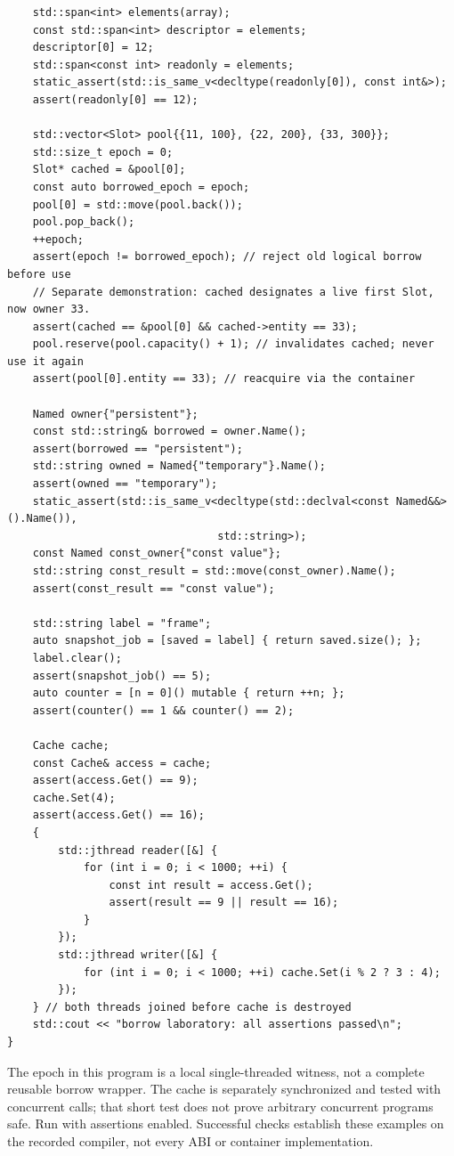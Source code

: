 \begin{verbatim}
    std::span<int> elements(array);
    const std::span<int> descriptor = elements;
    descriptor[0] = 12;
    std::span<const int> readonly = elements;
    static_assert(std::is_same_v<decltype(readonly[0]), const int&>);
    assert(readonly[0] == 12);

    std::vector<Slot> pool{{11, 100}, {22, 200}, {33, 300}};
    std::size_t epoch = 0;
    Slot* cached = &pool[0];
    const auto borrowed_epoch = epoch;
    pool[0] = std::move(pool.back());
    pool.pop_back();
    ++epoch;
    assert(epoch != borrowed_epoch); // reject old logical borrow before use
    // Separate demonstration: cached designates a live first Slot, now owner 33.
    assert(cached == &pool[0] && cached->entity == 33);
    pool.reserve(pool.capacity() + 1); // invalidates cached; never use it again
    assert(pool[0].entity == 33); // reacquire via the container

    Named owner{"persistent"};
    const std::string& borrowed = owner.Name();
    assert(borrowed == "persistent");
    std::string owned = Named{"temporary"}.Name();
    assert(owned == "temporary");
    static_assert(std::is_same_v<decltype(std::declval<const Named&&>().Name()),
                                 std::string>);
    const Named const_owner{"const value"};
    std::string const_result = std::move(const_owner).Name();
    assert(const_result == "const value");

    std::string label = "frame";
    auto snapshot_job = [saved = label] { return saved.size(); };
    label.clear();
    assert(snapshot_job() == 5);
    auto counter = [n = 0]() mutable { return ++n; };
    assert(counter() == 1 && counter() == 2);

    Cache cache;
    const Cache& access = cache;
    assert(access.Get() == 9);
    cache.Set(4);
    assert(access.Get() == 16);
    {
        std::jthread reader([&] {
            for (int i = 0; i < 1000; ++i) {
                const int result = access.Get();
                assert(result == 9 || result == 16);
            }
        });
        std::jthread writer([&] {
            for (int i = 0; i < 1000; ++i) cache.Set(i % 2 ? 3 : 4);
        });
    } // both threads joined before cache is destroyed
    std::cout << "borrow laboratory: all assertions passed\n";
}
\end{verbatim}

The epoch in this program is a local single-threaded witness, not a complete reusable borrow wrapper. The cache is separately synchronized and tested with concurrent calls; that short test does not prove arbitrary concurrent programs safe. Run with assertions enabled. Successful checks establish these examples on the recorded compiler, not every ABI or container implementation.

